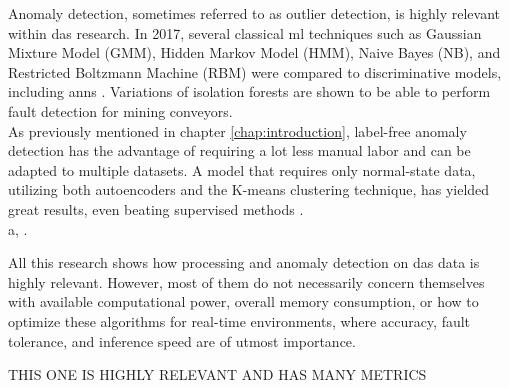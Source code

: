

Anomaly detection, sometimes referred to as outlier detection, is highly relevant within \acrshort{das} research. In 2017, several classical \acrshort{ml} techniques such as Gaussian Mixture Model (GMM), Hidden Markov Model (HMM), Naive Bayes (NB), and Restricted Boltzmann Machine (RBM) were compared to discriminative models, including \acrshort{ann}s \cite{app7080841}. Variations of isolation forests are shown to be able to perform fault detection for mining conveyors\cite{WIJAYA2022110330}. \\

As previously mentioned in chapter \ref{chap:introduction}, label-free anomaly detection has the advantage of requiring a lot less manual labor and can be adapted to multiple datasets. A model that requires only normal-state data, utilizing both autoencoders and the K-means clustering technique, has yielded great results, even beating supervised methods \cite{s23084094}. \\ 

a, \cite{10.14778/3538598.3538602} \cite{10.1145/3444690}.

All this research shows how processing and anomaly detection on \acrshort{das} data is highly relevant. However, most of them do not necessarily concern themselves with available computational power, overall memory consumption, or how to optimize these algorithms for real-time environments, where accuracy, fault tolerance, and inference speed are of utmost importance.



THIS ONE IS HIGHLY RELEVANT AND HAS MANY METRICS \cite{s23021009}